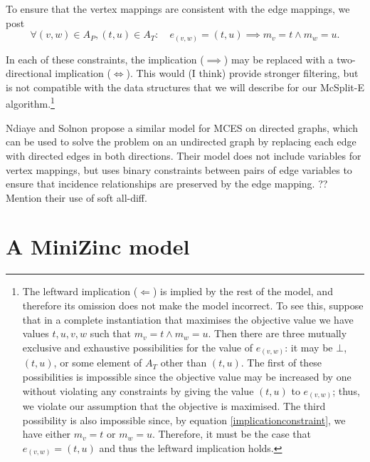 To ensure that the vertex mappings are consistent with the edge mappings, we post
\begin{equation}
\label{implicationconstraint}
\forall (v,w) \in A_P, (t,u) \in A_T : \quad e_{(v,w)} = (t,u) \implies m_v=t \wedge m_w=u.
\end{equation}

In each of these constraints, the implication ($\implies$) may be replaced with a two-directional
implication ($\Longleftrightarrow$).  This would (I think) provide stronger filtering, but is not
compatible with the data structures that we will describe for our McSplit-E
algorithm.\footnote{The leftward implication ($\Longleftarrow$)
is implied by the rest of the model, and therefore its omission does not make the model incorrect.
To see this, suppose that in a complete instantiation that maximises the objective value
we have values $t,u,v,w$ such
that $m_v=t \wedge m_w=u$.  Then there are three mutually exclusive and exhaustive possibilities for the
value of $e_{(v,w)}$: it may be $\bot$, $(t,u)$, or some element of $A_T$ other than $(t,u)$.
The first of these possibilities is impossible since the objective
value may be increased by one without violating any constraints by giving the value $(t,u)$ to $e_{(v,w)}$;
thus, we violate our assumption that the objective is maximised.
The third possibility is also impossible since, by equation \ref{implicationconstraint}, we have
either $m_v=t$ or $m_w=u$.  Therefore, it must be the case that $e_{(v,w)} = (t,u)$
and thus the leftward implication holds.}

Ndiaye and Solnon \cite{DBLP:conf/cp/NdiayeS11} propose a similar model for MCES on directed graphs,
which can be used to solve the problem on an undirected graph by replacing each edge with directed
edges in both directions.  Their model does not include variables for vertex mappings, but uses binary
constraints between pairs of edge variables to ensure that incidence relationships are preserved
by the edge mapping.  ?? Mention their use of soft all-diff.

%

\section{A MiniZinc model}

